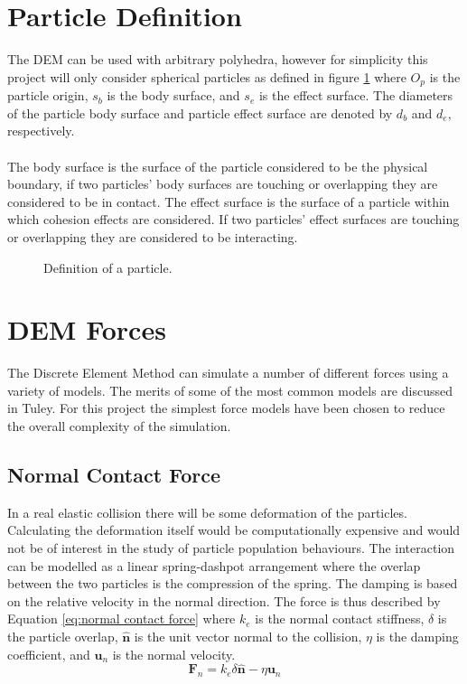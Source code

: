\documentclass[a4paper,11pt,titlepage]{report}
\begin{document}
\section{Particle Definition}
The DEM can be used with arbitrary polyhedra, however for simplicity this project will only consider spherical particles as defined in figure \ref{fig:particle} where $O_p$ is the particle origin, $s_b$ is the body surface, and $s_e$ is the effect surface. The diameters of the particle body surface and particle effect surface are denoted by $d_b$ and $d_e$, respectively.
\\\\The body surface is the surface of the particle considered to be the physical boundary, if two particles' body surfaces are touching or overlapping they are considered to be in contact. The effect surface is the surface of a particle within which cohesion effects are considered. If two particles' effect surfaces are touching or overlapping they are considered to be interacting.
\begin{figure}[!ht]
\centering

\caption{Definition of a particle.}
\label{fig:particle}
\end{figure}
\section{DEM Forces}
\label{sec:DEM Forces}
The Discrete Element Method can simulate a number of different forces using a variety of models. The merits of some of the most common models are discussed in Tuley\cite{tuley}. For this project the simplest force models have been chosen to reduce the overall complexity of the simulation.
\subsection{Normal Contact Force}
In a real elastic collision there will be some deformation of the particles. Calculating the deformation itself would be computationally expensive and would not be of interest in the study of particle population behaviours. The interaction can be modelled as a linear spring-dashpot arrangement where the overlap between the two particles is the compression of the spring. The damping is based on the relative velocity in the normal direction. The force is thus described by Equation \ref{eq:normal contact force} where $k_{e}$ is the normal contact stiffness, $\delta$ is the particle overlap, $\mathbf{\hat{n}}$ is the unit vector normal to the collision, $\eta$ is the damping coefficient, and $\mathbf{u}_{n}$ is the normal velocity.
\begin{equation}
\mathbf{F}_{n} = k_{e} \delta \mathbf{\hat{n}} - \eta \mathbf{u}_{n}
\label{eq:normal contact force}
\end{equation}
\end{document}

